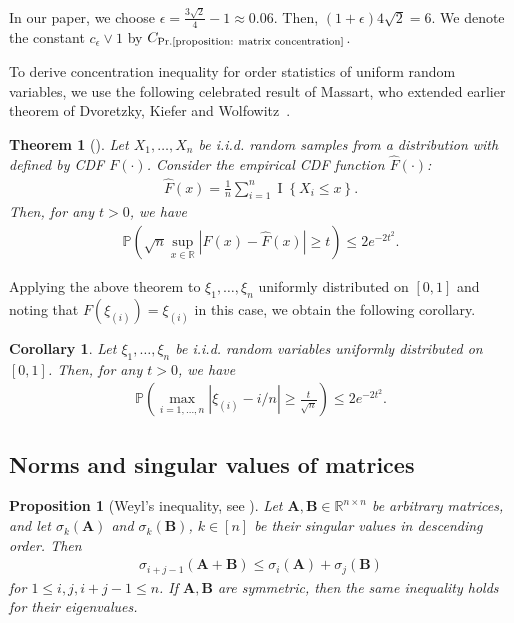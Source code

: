 \documentclass[11pt]{article}
\newcommand{\bbR}{\mathbb{R}}
\newcommand{\bA}{\bm{A}}
\newcommand{\bB}{\bm{B}}
\newcommand{\bbP}{\mathbb{P}}
\newcommand{\indicator}[1]{{\operatorname{I} \left \{ #1\right \}}}
\newcommand{\constantBandeira}{C_{\text{Pr.\ref{proposition: matrix concentration}}}}
\newcommand{\<}{\langle}
\renewcommand{\>}{\rangle}
\theoremstyle{plain}
\newtheorem{theorem}{Theorem}
\newtheorem{corollary}{Corollary}
\newtheorem{prop}{Proposition}
\theoremstyle{definition}
\theoremstyle{remark}
\begin{document}
{In our paper, we choose $\epsilon = \frac{3 \sqrt{2}}{4} - 1 \approx 0.06$. Then, $(1 + \epsilon) 4 \sqrt{2} = 6$. We denote the constant $c_\epsilon \vee 1$ by $\constantBandeira$. 

To derive concentration inequality for order statistics of uniform random variables, we use the following celebrated result of Massart, who extended earlier theorem of Dvoretzky, Kiefer and Wolfowitz~\citep{dvoretzky1956asymptotic}.

\begin{theorem}[\citep{massart1990tight}]
\label{theorem: massart DKW}
    Let $X_1, \ldots, X_n$ be i.i.d. random samples from a distribution with defined by CDF $F(\cdot)$. Consider the empirical CDF function $\widehat{F}(\cdot)$:
    \begin{align*}
        \widehat{F}(x) = \frac{1}{n} \sum_{i = 1}^n \indicator{X_i \le x}.
    \end{align*}
    Then, for any $t > 0$, we have
    \begin{align*}
        \bbP \left (\sqrt{n} \sup_{x \in \bbR} |F(x) - \widehat{F}(x) | \ge t \right ) \le 2 e^{-2t^2}.
    \end{align*}
\end{theorem}

Applying the above theorem to $\xi_1, \ldots, \xi_n$ uniformly distributed on $[0, 1]$ and noting that $F(\xi_{(i)}) = \xi_{(i)}$ in this case, we obtain the following corollary.

\begin{corollary}
\label{corollary: order statistics unifrom concentration}
Let $\xi_1, \ldots, \xi_n$ be i.i.d. random variables uniformly distributed on $[0, 1]$. Then, for any $t > 0$, we have
\begin{align*}
    \bbP \left ( \max_{i = 1, \ldots, n} |\xi_{(i)} - i/n|  \ge \frac{t}{\sqrt{n}} \right ) \le 2 e^{- 2 t^2}.
\end{align*}
\end{corollary}






\subsection{Norms and singular values of matrices}

\begin{prop}[Weyl's inequality, see \citep{bisgard2020}]
\label{proposition: weyl inequality}
	Let $\bA, \bB \in \bbR^{n \times n}$ be arbitrary matrices, and let $\sigma_k(\bA)$ and $\sigma_k(\bB)$, $k \in [n]$  be their singular values in descending order. Then
	\begin{align*}
		\sigma_{i + j - 1}(\bA + \bB) \le \sigma_{i}(\bA) + \sigma_j(\bB)
	\end{align*}
	for $1 \le i, j, i+ j - 1 \le  n$. If $\bA, \bB$ are symmetric, then the same inequality holds for their eigenvalues.
\end{prop}

}
\end{document}
